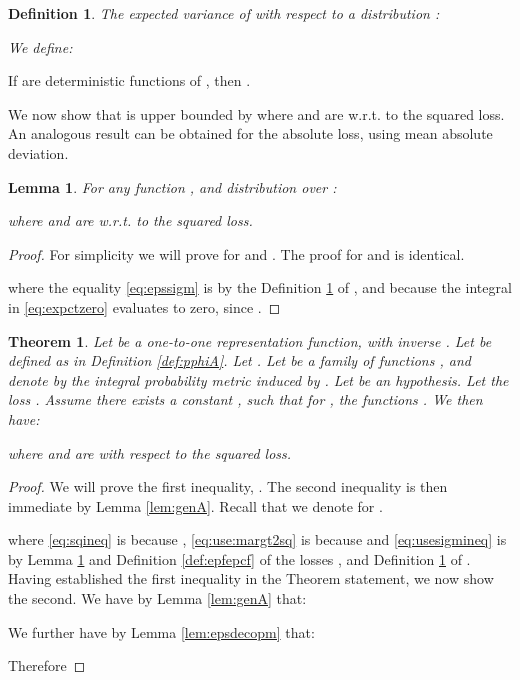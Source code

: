 \documentclass{article}
\newtheorem{thmappthm}{Theorem}
\newtheorem{thmappdef}{Definition}
\newtheorem{thmapplem}{Lemma}
\begin{document}
\begin{thmappdef}\label{def:sigma2}
The expected variance of  with respect to a distribution :

We define:

\end{thmappdef}
If  are deterministic functions of , then .


We now show that  is upper bounded by  where  and  are w.r.t. to the squared loss. An analogous result can be obtained for the absolute loss, using mean absolute deviation. 

\begin{thmapplem}\label{lem:epsmloss}
For any function , and distribution  over :

where  and  are w.r.t. to the squared loss.
\end{thmapplem}
\begin{proof}
For simplicity we will prove for  and . The proof for  and  is identical.

where the equality \eqref{eq:epssigm} is by the Definition \ref{def:sigma2} of , and because the integral in \eqref{eq:expctzero} evaluates to zero, since .
\end{proof}

\begin{thmappthm}\label{thm:indtausqloss}
Let  be a one-to-one representation function, with inverse . Let  be defined as in Definition \ref{def:pphiA}. Let . Let  be a family of functions , and denote by  the integral probability metric induced by .  Let  be an hypothesis. Let the loss .  Assume there exists a constant , such that for , the functions .
We then have:

where  and  are with respect to the squared loss.
\end{thmappthm}

\begin{proof}
We will prove the first inequality, . The second inequality is then immediate by Lemma \ref{lem:genA}.
Recall that we denote  for .

where \eqref{eq:sqineq} is because , \eqref{eq:use:margt2sq} is because  and \eqref{eq:usesigmineq} is by Lemma \ref{lem:epsmloss} and Definition \ref{def:epfepcf} of the losses ,  and Definition \ref{def:sigma2} of .
Having established the first inequality in the Theorem statement, we now show the second.
We have by Lemma \ref{lem:genA} that:

We further have by Lemma \ref{lem:epsdecopm} that:

Therefore 

\end{proof}
\end{document}
